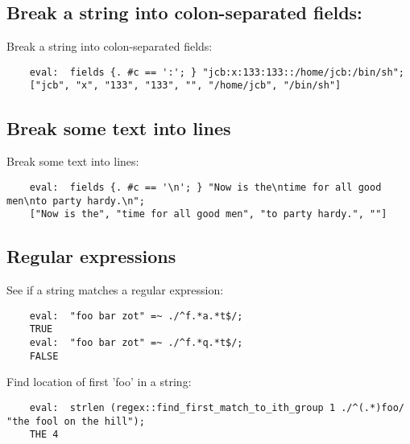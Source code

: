 \cutend*


\subsection{Break a string into colon-separated fields:}

Break a string into colon-separated fields:
\begin{verbatim}
    eval:  fields {. #c == ':'; } "jcb:x:133:133::/home/jcb:/bin/sh";
    ["jcb", "x", "133", "133", "", "/home/jcb", "/bin/sh"]
\end{verbatim}

\cutend*

\subsection{Break some text into lines}

Break some text into lines:
\begin{verbatim}
    eval:  fields {. #c == '\n'; } "Now is the\ntime for all good men\nto party hardy.\n";
    ["Now is the", "time for all good men", "to party hardy.", ""]
\end{verbatim}

\cutend*

\subsection{Regular expressions}
\label{section:tut:recipe:regular-expressions}

See if a string matches a regular expression:
\begin{verbatim}
    eval:  "foo bar zot" =~ ./^f.*a.*t$/;
    TRUE
    eval:  "foo bar zot" =~ ./^f.*q.*t$/;
    FALSE
\end{verbatim}

Find location of first 'foo' in a string:

\begin{verbatim}
    eval:  strlen (regex::find_first_match_to_ith_group 1 ./^(.*)foo/ "the fool on the hill");
    THE 4
\end{verbatim}



